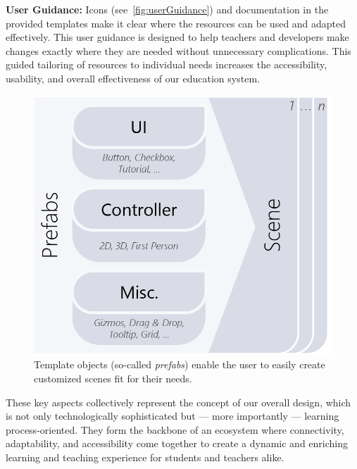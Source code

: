 \textbf{User Guidance:}
Icons (see~\autoref{fig:userGuidance}) and documentation in the provided templates make it clear where the resources can be used and adapted effectively. This user guidance is designed to help teachers and developers make changes exactly where they are needed without unnecessary complications. This guided tailoring of resources to individual needs increases the accessibility, usability, and overall effectiveness of our education system.
\begin{figure}[b]
	\centering
	\includegraphics[width=\linewidth]{pictures/unityPrefabs.png}
	\captionsetup{labelfont=bf,textfont=it}
	\caption{Template objects (so-called \emph{prefabs}) enable the user to easily create customized scenes fit for their needs. \label{fig:unityPrefabs}}
\end{figure}
These key aspects collectively represent the concept of our overall design, which is not only technologically sophisticated but --- more importantly --- learning process-oriented. They form the backbone of an ecosystem where connectivity, adaptability, and accessibility come together to create a dynamic and enriching learning and teaching experience for students and teachers alike.
